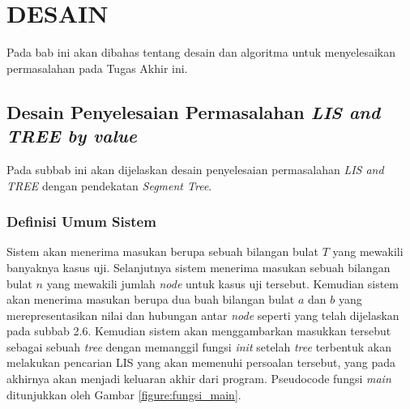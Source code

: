 \chapter{DESAIN}
\label{chapter:desain}

Pada bab ini akan dibahas tentang desain dan algoritma untuk menyelesaikan permasalahan pada Tugas Akhir ini.

\section{\quad Desain Penyelesaian Permasalahan \textit{LIS and TREE by value}}
\quad Pada subbab ini akan dijelaskan desain penyelesaian permasalahan \textit{LIS and TREE} dengan pendekatan \textit{Segment Tree}.
	\subsection{\quad Definisi Umum Sistem}
	\quad Sistem akan menerima masukan berupa sebuah bilangan bulat $T$ yang mewakili banyaknya kasus uji. Selanjutnya sistem menerima masukan sebuah bilangan bulat $n$ yang mewakili jumlah \textit{node} untuk kasus uji tersebut. Kemudian sistem akan menerima masukan berupa dua buah bilangan bulat $a$ dan $b$ yang merepresentasikan nilai dan hubungan antar \textit{node} seperti yang telah dijelaskan pada subbab 2.6. Kemudian sistem akan menggambarkan masukkan tersebut sebagai sebuah \textit{tree} dengan memanggil fungsi \textit{init} setelah \textit{tree} terbentuk akan melakukan pencarian LIS yang akan memenuhi persoalan tersebut, yang pada akhirnya akan menjadi keluaran akhir dari program. Pseudocode fungsi \textit{main} ditunjukkan oleh Gambar \ref{figure:fungsi_main}.
	
